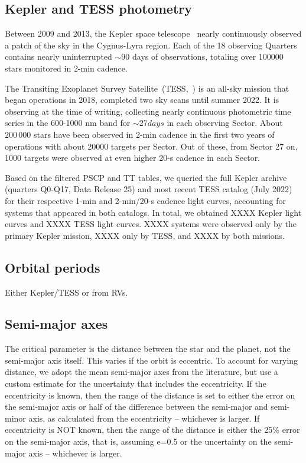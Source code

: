 \documentclass[twocolumn]{aastex631}
\begin{document}
\subsection{Kepler and TESS photometry}
Between 2009 and 2013, the Kepler space telescope~\citep{koch2010kepler} nearly continuously observed a patch of the sky in the Cygnus-Lyra region. Each of the 18 observing Quarters contains nearly uninterrupted $\sim 90$ days of observations, totaling over 100000 stars monitored in 2-min cadence. 

The Transiting Exoplanet Survey Satellite~(TESS,~\cite{ricker2015transiting}) is an all-sky mission that began operations in 2018, completed two sky scans until summer 2022. It is observing at the time of writing, collecting nearly continuous photometric time series in the 600-1000 nm band for $\sim 27 days$ in each observing Sector. About $200\,000$ stars have been observed in 2-min cadence in the first two years of operations with about 20000 targets per Sector. Out of these, from Sector 27 on, 1000 targets were observed at even higher 20-s cadence in each Sector. 

Based on the filtered PSCP and TT tables, we queried the full Kepler archive (quarters Q0-Q17, Data Release 25) and most recent TESS catalog (July 2022) for their respective 1-min and 2-min/20-s cadence light curves, accounting for systems that appeared in both catalogs. In total, we obtained XXXX Kepler light curves and XXXX TESS light curves. XXXX systems were observed only by the primary Kepler mission, XXXX only by TESS, and XXXX by both missions.


\subsection{Orbital periods}
Either Kepler/TESS or from RVs.

\subsection{Semi-major axes}
\label{sec:data:a}
The critical parameter is the distance between the star and the planet, not the semi-major axis itself. This varies if the orbit is eccentric. To account for varying distance, we adopt the mean semi-major axes from the literature, but use a custom estimate for the uncertainty that includes the eccentricity.
If the eccentricity is known, then the range of the distance is set to either the error on the semi-major axis or half of the difference between the semi-major and semi-minor axis, as calculated from the eccentricity -- whichever is larger. If eccentricity is NOT known, then the range of the distance is either the 25\% error on the semi-major axis, that is, assuming e=0.5 or the uncertainty on the semi-major axis -- whichever is larger.
\end{document}
